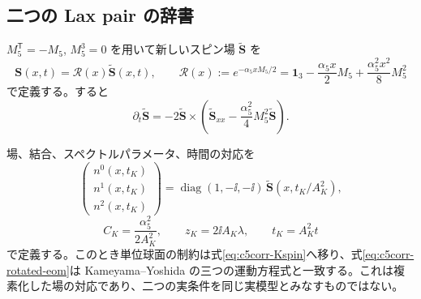 \subsection{二つの Lax pair の辞書}

$M_5^{\mathsf T}=-M_5$, $M_5^3=0$ を用いて新しいスピン場 $\widetilde{\boldsymbol S}$ を
\begin{equation}
\boldsymbol S(x,t)=\mathcal R(x)\widetilde{\boldsymbol S}(x,t),
\qquad
\mathcal R(x):=e^{-\alpha_5xM_5/2}
=\mathbf1_3-\frac{\alpha_5x}{2}M_5+\frac{\alpha_5^2x^2}{8}M_5^2
\label{eq:c5corr-rotation}
\end{equation}
で定義する。すると
\begin{equation}
\partial_t\widetilde{\boldsymbol S}
=-2\widetilde{\boldsymbol S}\times
\left(\widetilde{\boldsymbol S}_{xx}
-\frac{\alpha_5^2}{4}M_5^2\widetilde{\boldsymbol S}\right).
\label{eq:c5corr-rotated-eom}
\end{equation}

場、結合、スペクトルパラメータ、時間の対応を
\begin{equation}
\begin{pmatrix}n^0(x,t_K)\\n^1(x,t_K)\\n^2(x,t_K)\end{pmatrix}
=\operatorname{diag}(1,-\ii,-\ii)\,
\widetilde{\boldsymbol S}(x,t_K/A_K^2),
\label{eq:c5corr-field-dictionary}
\end{equation}
\begin{equation}
C_K=\frac{\alpha_5^2}{2A_K^2},
\qquad z_K=2\ii A_K\lambda,
\qquad t_K=A_K^2t
\label{eq:c5corr-parameter-K-dictionary}
\end{equation}
で定義する。このとき単位球面の制約は式\eqref{eq:c5corr-Kspin}へ移り、式\eqref{eq:c5corr-rotated-eom}は Kameyama--Yoshida の三つの運動方程式と一致する。これは複素化した場の対応であり、二つの実条件を同じ実模型とみなすものではない。

